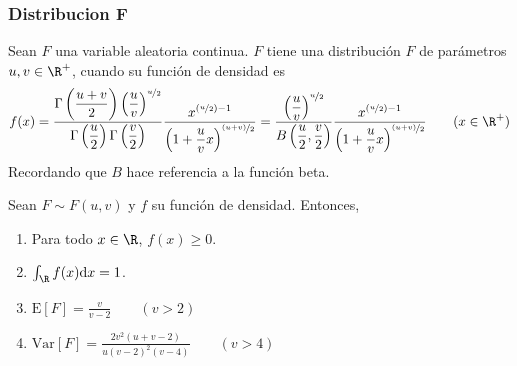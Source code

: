 \subsubsection{Distribucion F}

\begin{Def}
  Sean $F$ una variable aleatoria continua. $F$ tiene una distribución
  $F$ de parámetros $u,v\in\R^+$, cuando su función de densidad es
  \[f(x)=
  \dfrac{\Gamma\left(\frac{u+v}{2}\right)\left(\frac{u}{v}\right)^{\nicefrac{u}{2}}}
  {\Gamma\left(\frac{u}{2}\right)\Gamma\left(\frac{v}{2}\right)}
  \dfrac{x^{(\nicefrac{u}{2})-1}}
  {\left(1 + \frac{u}{v}x\right)^{\nicefrac{(u+v)}{2}}}
  =
  \dfrac{\left(\frac{u}{v}\right)^{\nicefrac{u}{2}}}
    {B\left(\frac{u}{2},\frac{v}{2}\right)}
  \dfrac{x^{(\nicefrac{u}{2})-1}}
    {\left(1 + \frac{u}{v}x\right)^{\nicefrac{(u+v)}{2}}}
  \qquad (x\in\R^+)
  \]
  Recordando que $B$ hace referencia a la función beta.
\end{Def}
\begin{Teo}
  Sean $F\sim F(u,v)$ y $f$ su función de densidad. Entonces,
  \begin{enumerate}
    \item Para todo $x\in\R$, $f(x) \geq 0$.
    \item $\int_{\R}f(x)\mathrm{d}x=1$.
    \item $\text{E}[F]=\frac{v}{v-2} \qquad(v>2)$
    \item $\text{Var}[F]=\frac{2v^2(u+v-2)}{u(v-2)^2(v-4)}\qquad(v>4)$
  \end{enumerate}
\end{Teo}
